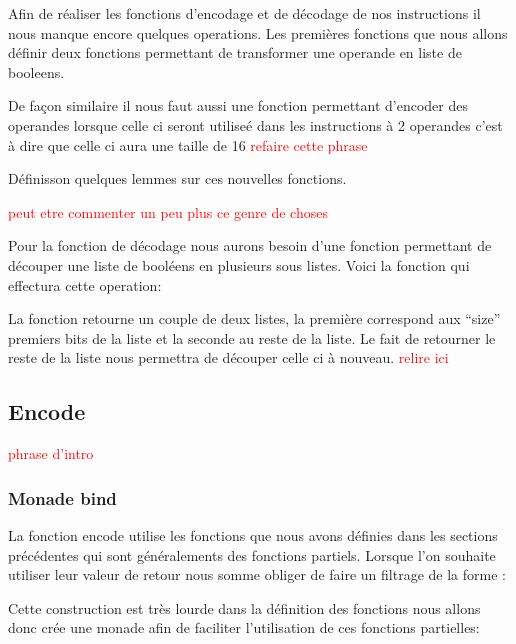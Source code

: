 \documentclass {article}
\newcommand{\codefrom}[3]
           {}
\theoremstyle{definition}
\theoremstyle{remark}
\newcommand{\todo}[1]{\textcolor{red}{#1}}
\begin{document}
Afin de réaliser les fonctions d'encodage et de décodage de nos instructions il nous manque encore quelques operations.
Les premières fonctions que nous allons définir deux fonctions permettant de transformer une operande en liste de booleens.

\codefrom{src}{encode}{operand_to_bin}

De façon similaire il nous faut aussi une fonction permettant d'encoder des operandes lorsque celle ci seront utiliseé dans
les instructions à 2 operandes c'est à dire que celle ci aura une taille de 16 \todo{refaire cette phrase}

\codefrom{src}{encode}{operand_to_bin_double}

Définisson quelques lemmes sur ces nouvelles fonctions.
\codefrom{src}{encode}{operand_to_bin_hypothesis_reg}
\codefrom{src}{encode}{operand_to_bin_hypothesis_imm}
\codefrom{src}{encode}{operand_to_bin_size}
\todo{peut etre commenter un peu plus ce genre de choses}


Pour la fonction de décodage nous aurons besoin d'une fonction permettant de découper
une liste de booléens en plusieurs sous listes. Voici la fonction qui effectura cette operation:

\codefrom{src}{encode}{get_first_n_bit}

La fonction retourne un couple de deux listes, la première correspond aux ``size'' premiers
bits de la liste et la seconde au reste  de la liste. Le fait de retourner le reste de la liste
nous permettra de découper celle ci à nouveau.
\todo{relire ici}




\subsection{Encode}

\todo{phrase d'intro}

\subsubsection{Monade bind}

La fonction encode utilise les fonctions que nous avons définies dans les sections précédentes qui sont généralements
des fonctions partiels. Lorsque l'on souhaite utiliser leur valeur de retour nous somme obliger de faire un
filtrage de la forme :

\codefrom{rapport}{definitions}{pattern_matching}

Cette construction est très lourde dans la définition des fonctions nous allons donc crée une monade
afin de faciliter l'utilisation de ces fonctions partielles:
\end{document}
